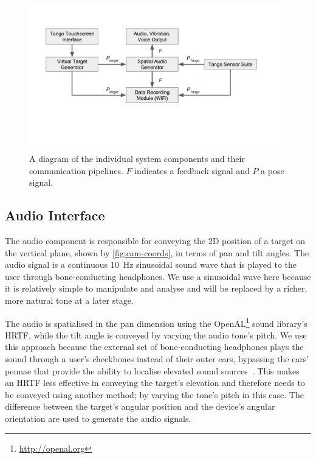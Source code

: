 \documentclass[sigconf, screen=true, anonymous=true]{acmart}
\begin{document}
\begin{figure}
  \centering
  \includegraphics[clip=true, trim=0 120 80 50, width=1.0\columnwidth]{figures/pipeline.pdf}
  \caption{A diagram of the individual system components and their communication pipelines. $F$ indicates a feedback signal and $P$ a pose signal. }\label{fig:pipeline}
\end{figure}

\subsection{Audio Interface}

The audio component is responsible for conveying the 2D position of a target on the vertical plane, shown by \cref{fig:cam-coords}, in terms of pan and tilt angles.
The audio signal is a continuous \SI{10}{\hertz} sinusoidal sound wave that is played to the user through bone-conducting headphones.
We use a sinusoidal wave here because it is relatively simple to manipulate and analyse and will be replaced by a richer, more natural tone at a later stage. 

The audio is spatialised in the pan dimension using the OpenAL\footnote{\url{http://openal.org}} sound library's HRTF, while the tilt angle is conveyed by varying the audio tone's pitch.
We use this approach because the external set of bone-conducting headphones plays the sound through a user's cheekbones instead of their outer ears, bypassing the ears' pennae that provide the ability to localise elevated sound sources~\cite{roffler1968factors, algazi2001elevation}.
This makes an HRTF less effective in conveying the target's elevation and therefore needs to be conveyed using another method; by varying the tone's pitch in this case.
The difference between the target's angular position and the device's angular orientation are used to generate the audio signals. 
\end{document}
